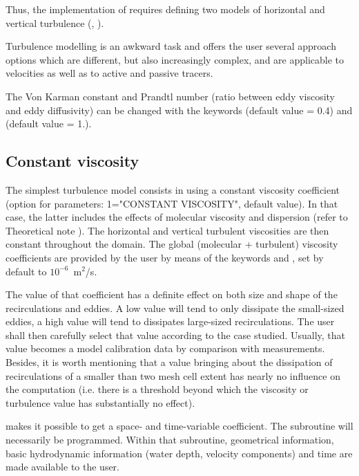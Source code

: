Thus, the implementation of  requires defining two models of
horizontal and vertical turbulence (,
).

Turbulence modelling is an awkward task and  offers the user several
approach options which are different, but also increasingly complex, and are
applicable to velocities as well as to active and passive tracers.

The Von Karman constant and Prandtl number (ratio between eddy viscosity and
eddy diffusivity) can be changed with the keywords 
(default value = 0.4) and  (default value = 1.).

\subsection{Constant viscosity}

The simplest turbulence model consists in using a constant viscosity
coefficient (option for parameters: 1="CONSTANT VISCOSITY", default value). In
that case, the latter includes the effects of molecular viscosity and
dispersion (refer to Theoretical note \cite{Hervouet2007}).
The horizontal and vertical
turbulent viscosities are then constant throughout the domain. The global
(molecular + turbulent) viscosity coefficients are provided by the user by
means of the keywords  and , set
by default to $10^{-6}$~m$^2$/s.

The value of that coefficient has a definite effect on both size and shape of
the recirculations and eddies. A low value will tend to only dissipate the
small-sized eddies, a high value will tend to dissipates large-sized
recirculations. The user shall then carefully select that value according to
the case studied. Usually, that value becomes a model calibration data by
comparison with measurements. Besides, it is worth mentioning that a value
bringing about the dissipation of recirculations of a smaller than two mesh
cell extent has nearly no influence on the computation (i.e. there is a
threshold beyond which the viscosity or turbulence value has substantially no
effect).

 makes it possible to get a space- and time-variable coefficient.
The  subroutine will necessarily be programmed.
Within that subroutine, geometrical information, basic hydrodynamic
information (water depth, velocity components) and time are made available
to the user.

